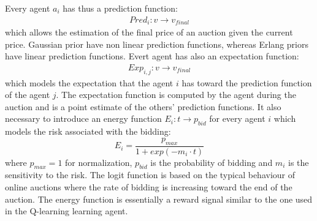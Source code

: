 Every agent $a_i$ has thus a prediction function:
\begin{eqnarray}
Pred_{i}:v \rightarrow v_{final}
\end{eqnarray}
which allows the estimation of the final price of an auction given the current price.
Gaussian prior have non linear prediction functions, whereas Erlang priors have
 linear prediction functions.
Evert agent has also an expectation function:
\begin{eqnarray}
 Exp_{i,j}:v \rightarrow v_{final}
\end{eqnarray}
 which models the expectation that the agent $i$ has toward the prediction
function of the agent $j$.
The expectation function is computed by the agent during the auction and is a
point estimate of the others' prediction functions.
It also necessary to introduce an energy function $E_{i}: t \rightarrow p_{bid} $
 for every agent $i$ which models the risk associated with the bidding:
\begin{equation}
E_{i}=\frac{p_{max}}{1+exp(-m_{i} \cdot t)}
\end{equation}
where $p_{max}=1$ for normalization, $p_{bid}$ is the probability of bidding and
 $m_{i}$ is the sensitivity to the risk. The logit function is based on the typical
behaviour of online auctions where the rate of bidding is increasing toward the end
of the auction.
The energy function is essentially a reward signal similar to the one used in
the Q-learning learning agent.

